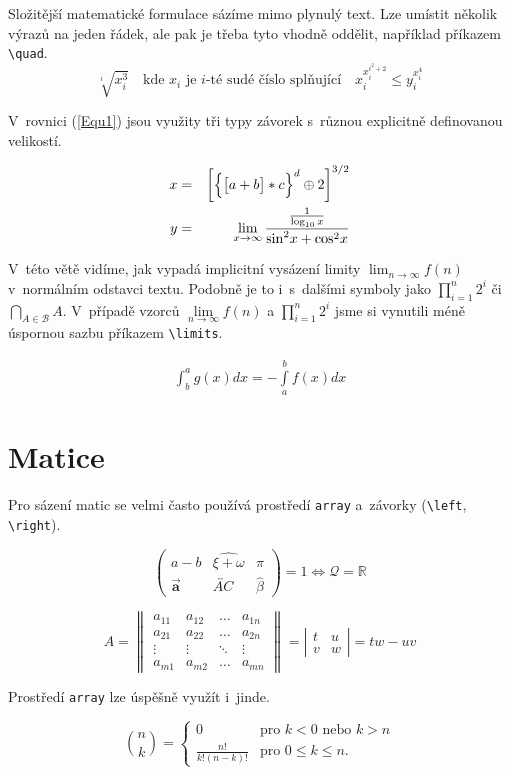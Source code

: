 \documentclass[a4paper, 11pt, twocolumn]{article}
\begin{document}
Složitější matematické formulace sázíme mimo plynulý text. Lze umístit několik výrazů na jeden řádek, ale pak je třeba tyto vhodně oddělit, například příkazem \verb|\quad|.
$$\sqrt[i]{x_i^{3}}\quad \text{kde $x_i$ je $i$-té sudé číslo splňující}\quad x_i^{x_i^{i^{2}+2}}\leq y_i^{x_i^{4}}$$

V~rovnici (\ref{Equ1}) jsou využity tři typy závorek s~různou explicitně definovanou velikostí.

\begin{eqnarray}\label{Equ1}
x & = & \bigg[ \Big\{ \big[a+b\big]\ast c\Big\}^d \oplus 2\bigg]^{3/2}\\
y & = & \lim\limits_{x \to \infty} \frac{\frac{1}{\log_{10} x}}
{\textnormal{\fontfamily{cmr}\selectfont{sin}}^2 x + \textnormal{\fontfamily{cmr}\selectfont{cos}}^2 x}\nonumber
\end{eqnarray}

V~této větě vidíme, jak vypadá implicitní vysázení limity $\lim_{n\rightarrow \infty}f(n)$ v~normálním odstavci textu. Podobně je to i~s~dalšími symboly jako $\prod _{i=1}^n 2^i$ či $\bigcap_{A\in\mathcal{B}}A$. V~případě vzorců $\lim\limits_{n\to \infty}f(n)$ a $\prod\limits _{i=1}^n 2^i$ jsme si vynutili méně úspornou sazbu příkazem \verb|\limits|.

\begin{eqnarray}\label{Equ2}
\int _b^a g(x)dx = \minus \int\limits_{a}^b f(x)dx
\end{eqnarray}

\section{Matice}

Pro sázení matic se velmi často používá prostředí \texttt{array} a~závorky (\verb|\left|, \verb|\right|).

$$\left(
\begin{array}{ccc}
a-b & \widehat{\xi + \omega} & \pi\\
\vec{\mathbf{a}} & \overleftrightarrow{AC} & \widehat{\beta}
\end{array}
\right) = 1 \Longleftrightarrow \mathcal{Q} = \mathbb{R}$$

$$A = \left\|
\begin{array}{cccc}
a_{11} & a_{12} & \ldots & a_{1n}\\
a_{21} & a_{22} & \ldots & a_{2n}\\
\vdots & \vdots & \ddots & \vdots\\
a_{m1} & a_{m2} & \ldots & a_{mn}
\end{array}
\right\| = \left|
\begin{array}{cc}
t & u\\
v & w
\end{array}
\right| = tw \minus uv$$

Prostředí \texttt{array} lze úspěšně využít i~jinde.

$$\binom{n}{k} =
\left\{
\begin{array}{cc}
0 & \mbox{pro $k < 0 \text{ nebo } k > n$}\\
\frac{n!}{k!(n\minus k)!} & \mbox{pro $0 \leq k \leq n$}.
\end{array}
\right.$$
\end{document}
